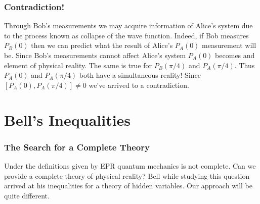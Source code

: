 \documentclass{beamer}
\begin{document}
\begin{frame}

	\frametitle{Contradiction!}
	
	Through Bob's measurements we may acquire information of Alice's system due to the process known as collapse of the wave function. Indeed, if Bob measures $P_B(0)$ then we can predict what the result of Alice's $P_A(0)$ measurement will be. Since Bob's measurements cannot affect Alice's system $P_A(0)$ becomes and element of physical reality. The same is true for $P_B(\pi/4)$ and $P_A(\pi/4)$. Thus $P_A(0)$ and $P_A(\pi/4)$ both have a simultaneous reality! Since $[P_A(0),P_A(\pi/4)]\neq 0$ we've arrived to a contradiction. 

\end{frame}

\section{Bell's Inequalities}

\begin{frame}

	\frametitle{The Search for a Complete Theory}
	
	Under the definitions given by EPR quantum mechanics is not complete. Can we provide a complete theory of physical reality? Bell while studying this question arrived at his inequalities for a theory of hidden variables\cite{Bell1964}. Our approach will be quite different.

\end{frame}
	
\end{document}
